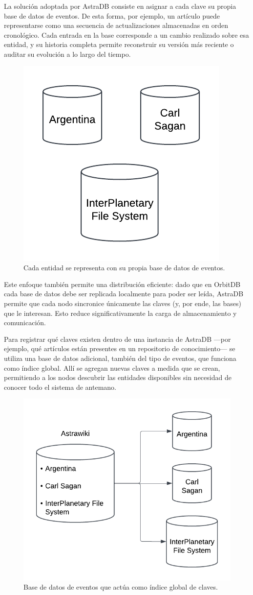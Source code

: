 La solución adoptada por AstraDB consiste en asignar a cada clave su propia base de datos de eventos. De esta forma, por ejemplo, un artículo puede representarse como una secuencia de actualizaciones almacenadas en orden cronológico. Cada entrada en la base corresponde a un cambio realizado sobre esa entidad, y su historia completa permite reconstruir su versión más reciente o auditar su evolución a lo largo del tiempo.

\begin{figure}[H]
\centering
\includegraphics[width=0.4\linewidth]{img/solucion-ipfs/bdd-articulos.png}
\caption{Cada entidad se representa con su propia base de datos de eventos.}
\label{fig:bdd-articulos}
\end{figure}

Este enfoque también permite una distribución eficiente: dado que en OrbitDB cada base de datos debe ser replicada localmente para poder ser leída, AstraDB permite que cada nodo sincronice únicamente las claves (y, por ende, las bases) que le interesan. Esto reduce significativamente la carga de almacenamiento y comunicación.

Para registrar qué claves existen dentro de una instancia de AstraDB —por ejemplo, qué artículos están presentes en un repositorio de conocimiento— se utiliza una base de datos adicional, también del tipo de eventos, que funciona como índice global. Allí se agregan nuevas claves a medida que se crean, permitiendo a los nodos descubrir las entidades disponibles sin necesidad de conocer todo el sistema de antemano.

\begin{figure}[H]
\centering
\includegraphics[width=0.6\linewidth]{img/solucion-ipfs/bdd-wiki.png}
\caption{Base de datos de eventos que actúa como índice global de claves.}
\label{fig:bdd-wiki}
\end{figure}

